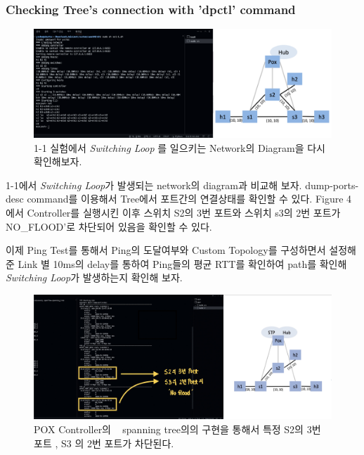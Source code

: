 \subsubsection*{Checking Tree's connection with 'dpctl' command}
    \vspace{-2mm}
\begin{figure}[!h]\centering 
	\includegraphics[width=.99\textwidth]{image/week08/1-2-0.png}
	\caption{\footnotesize
	1-1 실험에서 \textit{Switching Loop} 를 일으키는 Network의 Diagram을 다시 확인해보자. }
	\vspace{-10pt}
\end{figure}
1-1에서 \textit{Switching Loop}가 발생되는 network의 diagram과 비교해 보자. dump-ports-desc command를 이용해서 Tree에서 포트간의 연결상태를 확인할 수 있다. Figure 4에서 Controller를 실행시킨 이후 스위치 S2의 3번 포트와 스위치 s3의 2번 포트가 NO\_FLOOD'로 차단되어 있음을 확인할 수 있다.

이제 Ping Test를 통해서 Ping의 도달여부와 Custom Topology를 구성하면서 설정해준 Link 별 10ms의 delay를 통하여 Ping들의 평균 RTT를 확인하여 path를 확인해 \textit{Switching Loop}가 발생하는지 확인해 보자.
\clearpage
\vspace{-4mm}
\begin{figure}[!h]\centering 
	\includegraphics[width=.99\textwidth]{image/week08/1-2-1.png}
	\caption{\footnotesize
	POX Controller의 ~ spanning tree의의 구현을 통해서 특정 S2의 3번 포트 , S3 의 2번 포트가 차단된다.}
	\vspace{-10pt}
\end{figure}
    \vspace{-4mm}

